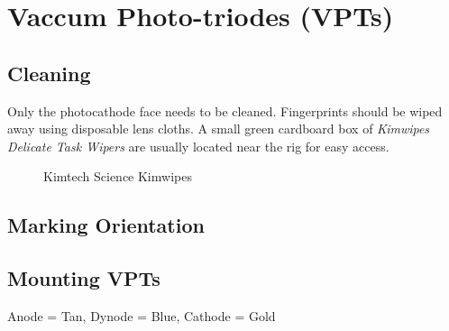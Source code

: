 
\section{Vaccum Photo-triodes (VPTs)}
\label{sec:op_vpt}

\subsection{Cleaning}
\label{sec:op_vpt:cleaning}

Only the photocathode face needs to be cleaned.  Fingerprints should be wiped away using disposable lens cloths.  A small green cardboard box of \textit{Kimwipes Delicate Task Wipers} are usually located near the rig for easy access.

\begin{figure}[hbtp]
  \centering
  \caption{Kimtech Science Kimwipes}
  \label{fig:op_vpt:cleaning:kimwipes}
\end{figure}


\subsection{Marking Orientation}
\label{sec:op_vpt:orienting}

\subsection{Mounting VPTs}
\label{sec:op_vpt:mounting}

Anode = Tan, Dynode = Blue, Cathode = Gold



